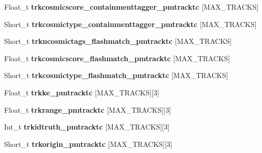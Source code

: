\begin{DoxyCompactItemize}
\item 
\hypertarget{classanatree_a86eb981b40ae60da0c439947b4a011c2}{Float\-\_\-t {\bfseries trkcosmicscore\-\_\-containmenttagger\-\_\-pmtracktc} \mbox{[}M\-A\-X\-\_\-\-T\-R\-A\-C\-K\-S\mbox{]}}\label{classanatree_a86eb981b40ae60da0c439947b4a011c2}

\item 
\hypertarget{classanatree_abc3c285943f8c1e728b1322d3a2fd6ea}{Short\-\_\-t {\bfseries trkcosmictype\-\_\-containmenttagger\-\_\-pmtracktc} \mbox{[}M\-A\-X\-\_\-\-T\-R\-A\-C\-K\-S\mbox{]}}\label{classanatree_abc3c285943f8c1e728b1322d3a2fd6ea}

\item 
\hypertarget{classanatree_a9ae23552b9c97855a48975455d5919dd}{Short\-\_\-t {\bfseries trkncosmictags\-\_\-flashmatch\-\_\-pmtracktc} \mbox{[}M\-A\-X\-\_\-\-T\-R\-A\-C\-K\-S\mbox{]}}\label{classanatree_a9ae23552b9c97855a48975455d5919dd}

\item 
\hypertarget{classanatree_a186931ceae13970e98a9e0c5abac3b79}{Float\-\_\-t {\bfseries trkcosmicscore\-\_\-flashmatch\-\_\-pmtracktc} \mbox{[}M\-A\-X\-\_\-\-T\-R\-A\-C\-K\-S\mbox{]}}\label{classanatree_a186931ceae13970e98a9e0c5abac3b79}

\item 
\hypertarget{classanatree_a1434a7f0ee354b1d1ab19a4e938f833f}{Short\-\_\-t {\bfseries trkcosmictype\-\_\-flashmatch\-\_\-pmtracktc} \mbox{[}M\-A\-X\-\_\-\-T\-R\-A\-C\-K\-S\mbox{]}}\label{classanatree_a1434a7f0ee354b1d1ab19a4e938f833f}

\item 
\hypertarget{classanatree_af0afdb9e534b9cf7d849ae2649367e5a}{Float\-\_\-t {\bfseries trkke\-\_\-pmtracktc} \mbox{[}M\-A\-X\-\_\-\-T\-R\-A\-C\-K\-S\mbox{]}\mbox{[}3\mbox{]}}\label{classanatree_af0afdb9e534b9cf7d849ae2649367e5a}

\item 
\hypertarget{classanatree_af42f7a01fa5915855e38ba562699f4b3}{Float\-\_\-t {\bfseries trkrange\-\_\-pmtracktc} \mbox{[}M\-A\-X\-\_\-\-T\-R\-A\-C\-K\-S\mbox{]}\mbox{[}3\mbox{]}}\label{classanatree_af42f7a01fa5915855e38ba562699f4b3}

\item 
\hypertarget{classanatree_a909a4bd609aeb07b38c5349d249d6c3d}{Int\-\_\-t {\bfseries trkidtruth\-\_\-pmtracktc} \mbox{[}M\-A\-X\-\_\-\-T\-R\-A\-C\-K\-S\mbox{]}\mbox{[}3\mbox{]}}\label{classanatree_a909a4bd609aeb07b38c5349d249d6c3d}

\item 
\hypertarget{classanatree_a700d7d60e968a6971cd4e071b432a89e}{Short\-\_\-t {\bfseries trkorigin\-\_\-pmtracktc} \mbox{[}M\-A\-X\-\_\-\-T\-R\-A\-C\-K\-S\mbox{]}\mbox{[}3\mbox{]}}\label{classanatree_a700d7d60e968a6971cd4e071b432a89e}


\end{DoxyCompactItemize}
